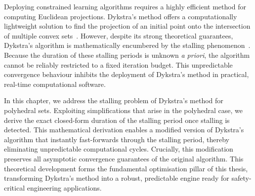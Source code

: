 Deploying constrained learning algorithms requires a highly efficient method for computing Euclidean projections. Dykstra's method offers a computationally lightweight solution to find the projection of an initial point onto the intersection of multiple convex sets~\cite{KEMPF20206542}. However, despite its strong theoretical guarantees, Dykstra's algorithm is mathematically encumbered by the stalling phenomenon~\cite{DYKSTRASTALLING}. Because the duration of these stalling periods is unknown \emph{a priori}, the algorithm cannot be reliably restricted to a fixed iteration budget. This unpredictable convergence behaviour inhibits the deployment of Dykstra's method in practical, real-time computational software.

In this chapter, we address the stalling problem of Dykstra's method for polyhedral sets. Exploiting simplifications that arise in the polyhedral case, we derive the exact closed-form duration of the stalling period once stalling is detected. This mathematical derivation enables a modified version of Dykstra's algorithm that instantly fast-forwards through the stalling period, thereby eliminating unpredictable computational cycles. Crucially, this modification preserves all asymptotic convergence guarantees of the original algorithm. This theoretical development forms the fundamental optimisation pillar of this thesis, transforming Dykstra's method into a robust, predictable engine ready for safety-critical engineering applications.


